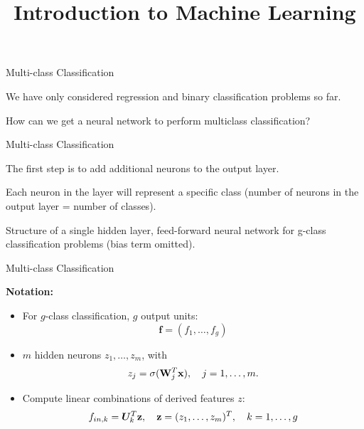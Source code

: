 \documentclass[11pt,compress,t,notes=noshow, xcolor=table]{beamer}
\title{Introduction to Machine Learning}
\begin{document}



\begin{framei}[sep=L]{Multi-class Classification}
\vfill
\item We have only considered regression and binary classification problems so far.
\vfill
\item How can we get a neural network to perform multiclass classification?
\vfill
\end{framei}

\begin{framei} {Multi-class Classification}
\item The first step is to add additional neurons to the output layer.
\item Each neuron in the layer will represent a specific class (number of neurons in the output layer = number of classes).
\centerline{\footnotesize Structure of a single hidden layer, feed-forward neural network for g-class classification problems (bias term omitted).}
\end{framei}

\begin{framei} {Multi-class Classification}
\vfill
\item \textbf{Notation:}
\begin{itemize}
\item For $g$-class classification, $g$ output units: $$\mathbf{f} = (f_1, \dots, f_g)$$
\item $m$ hidden neurons $z_1, \dots, z_m$, with
    $$ z_j = \sigma(\mathbf{W}_j^T \mathbf{x}), \quad j = 1,\ldots,m. $$
\item Compute linear combinations of derived features $z$:
    $$ f_{in,k} = \bm{U}_k^T \mathbf{z}, \quad \mathbf{z}=(z_1,\dots, z_m)^T, \quad k = 1,\ldots,g$$
\end{itemize}
\end{framei}
\end{document}
